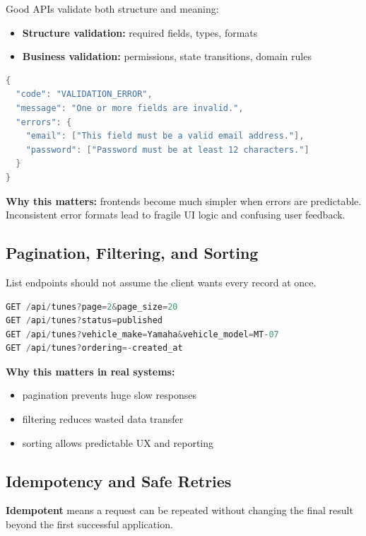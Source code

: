 \documentclass[12pt, a4paper, oneside]{book}
\begin{document}
Good APIs validate both structure and meaning:
\begin{itemize}[leftmargin=2em]
    \item \textbf{Structure validation:} required fields, types, formats
    \item \textbf{Business validation:} permissions, state transitions, domain rules
\end{itemize}

\begin{lstlisting}[language=Java, caption={Consistent API error response example}]
{
  "code": "VALIDATION_ERROR",
  "message": "One or more fields are invalid.",
  "errors": {
    "email": ["This field must be a valid email address."],
    "password": ["Password must be at least 12 characters."]
  }
}
\end{lstlisting}

\textbf{Why this matters:} frontends become much simpler when errors are predictable. Inconsistent error formats lead to fragile UI logic and confusing user feedback.

\subsection{Pagination, Filtering, and Sorting}

List endpoints should not assume the client wants every record at once.

\begin{lstlisting}[language=Java, caption={Readable list API patterns}]
GET /api/tunes?page=2&page_size=20
GET /api/tunes?status=published
GET /api/tunes?vehicle_make=Yamaha&vehicle_model=MT-07
GET /api/tunes?ordering=-created_at
\end{lstlisting}

\textbf{Why this matters in real systems:}
\begin{itemize}[leftmargin=2em]
    \item pagination prevents huge slow responses
    \item filtering reduces wasted data transfer
    \item sorting allows predictable UX and reporting
\end{itemize}

\subsection{Idempotency and Safe Retries}

\textbf{Idempotent} means a request can be repeated without changing the final result beyond the first successful application.
\end{document}
